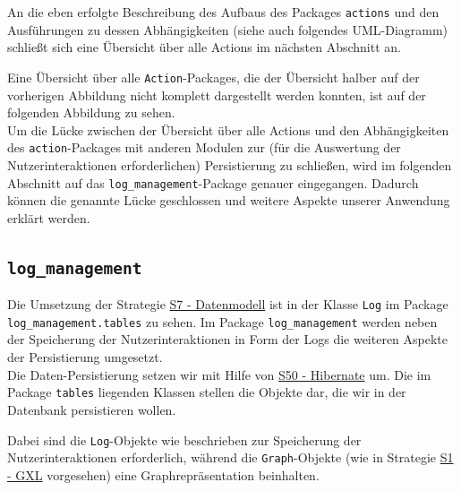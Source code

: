 \documentclass[enabledeprecatedfontcommands,fontsize=11pt,paper=a4,twoside]{scrartcl}
\newcounter{one}
\begin{document}
An die eben erfolgte Beschreibung des Aufbaus des Packages \texttt{actions} und den Ausführungen zu dessen Abhängigkeiten (siehe auch folgendes UML-Diagramm) schließt sich eine Übersicht über alle Actions im nächsten Abschnitt an.



Eine Übersicht über alle \texttt{Action}-Packages, die der Übersicht halber auf der vorherigen Abbildung nicht komplett dargestellt werden konnten, ist auf der folgenden Abbildung zu sehen. \\

Um die Lücke zwischen der Übersicht über alle Actions und den Abhängigkeiten des \texttt{action}-Packages mit anderen Modulen zur (für die Auswertung der Nutzerinteraktionen erforderlichen) Persistierung zu schließen, wird im folgenden Abschnitt auf das \texttt{log\_management}-Package genauer eingegangen. Dadurch können die genannte Lücke geschlossen und weitere Aspekte unserer Anwendung erklärt werden. 




\subsection{\texttt{log\_management}}

Die Umsetzung der Strategie \hyperlink{aaa}{S7 - Datenmodell} ist in der Klasse \texttt{Log} im Package \texttt{log\_management.tables} zu sehen. Im Package \texttt{log\_management} werden neben der Speicherung der Nutzerinteraktionen in Form der Logs die weiteren Aspekte der Persistierung umgesetzt. \\
Die Daten-Persistierung setzen wir mit Hilfe von \hyperlink{rrr}{S50 - Hibernate} um. Die im Package \texttt{tables} liegenden Klassen stellen die Objekte dar, die wir in der Datenbank persistieren wollen. 



Dabei sind die \texttt{Log}-Objekte wie beschrieben zur Speicherung der Nutzerinteraktionen erforderlich, während die \texttt{Graph}-Objekte (wie in Strategie \hyperlink{yy}{S1 - GXL} vorgesehen) eine Graphrepräsentation beinhalten. \\
\end{document}
